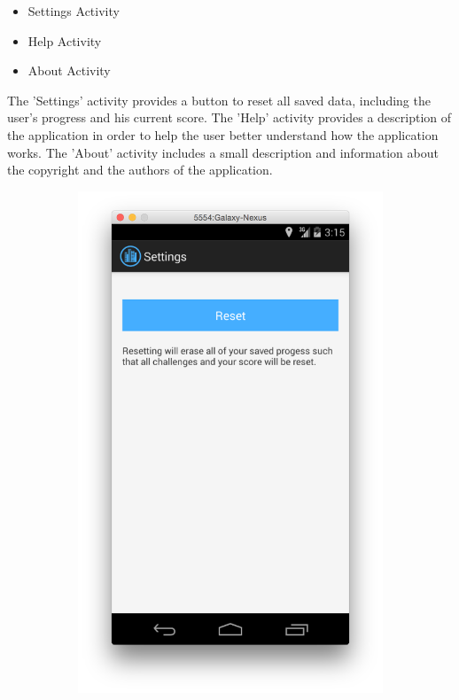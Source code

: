 \begin{itemize}
	\item Settings Activity
	\item Help Activity
	\item About Activity
\end{itemize}

\noindent
The 'Settings' activity provides a button to reset all saved data, including the user's progress and his current score. The 'Help' activity provides a description of the application in order to help the user better understand how the application works. The 'About' activity includes a small description and information about the copyright and the authors of the application.

\begin{figure}[H]
	\centering
	\begin{subfigure}[b]{0.3\textwidth}
                \includegraphics[width=\textwidth]{Figures/SettingsActivity}

\end{subfigure}
\end{figure}
